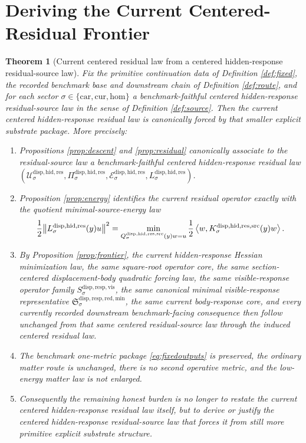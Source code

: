 \documentclass[11pt]{article}
\newcommand{\Car}{\mathrm{car}}
\newcommand{\Cur}{\mathrm{cur}}
\newcommand{\Hom}{\mathrm{hom}}
\newcommand{\VisibleResponseOperator}[1]{S_{#1}^{\mathrm{disp,resp,vis}}}
\newcommand{\MinimalReducedStructure}{\mathfrak S^{\mathrm{disp,resp,red,min}}}
\newcommand{\ResidualState}[1]{\mathcal U_{#1}^{\mathrm{disp,hid,res}}}
\newcommand{\ResidualTarget}[1]{\mathcal E_{#1}^{\mathrm{disp,hid,res}}}
\newcommand{\ResidualReadout}[1]{\Pi_{#1}^{\mathrm{disp,hid,res}}}
\newcommand{\ResidualOperator}[1]{L_{#1}^{\mathrm{disp,hid,res}}}
\newcommand{\ResidualSourceProjection}[1]{Q_{#1}^{\mathrm{disp,hid,res,src}}}
\newcommand{\ResidualSourceOperator}[1]{K_{#1}^{\mathrm{disp,hid,res,src}}}
\newtheorem{theorem}{Theorem}
\begin{document}
\section{Deriving the Current Centered-Residual Frontier}

\begin{theorem}[Current centered residual law from a centered hidden-response residual-source law]
\label{thm:main}
Fix the primitive continuation data of Definition \ref{def:fixed}, the recorded benchmark base and downstream chain of Definition \ref{def:route}, and for each sector \(\sigma\in\{\Car,\Cur,\Hom\}\) a benchmark-faithful centered hidden-response residual-source law in the sense of Definition \ref{def:source}. Then the current centered hidden-response residual law is canonically forced by that smaller explicit substrate package. More precisely:
\begin{enumerate}
    \item Propositions \ref{prop:descent} and \ref{prop:residual} canonically associate to the residual-source law a benchmark-faithful centered hidden-response residual law \((\ResidualState{\sigma},\ResidualReadout{\sigma},\ResidualTarget{\sigma},\ResidualOperator{\sigma})\).
    \item Proposition \ref{prop:energy} identifies the current residual operator exactly with the quotient minimal-source-energy law
    \[
    \frac{1}{2}
    \norm{\ResidualOperator{\sigma}(y)u}^{2}
    =
    \min_{\ResidualSourceProjection{\sigma}(y)w=u}
    \frac{1}{2}
    \ev{
    w,\ResidualSourceOperator{\sigma}(y)w
    }.
    \]
    \item By Proposition \ref{prop:frontier}, the current hidden-response Hessian minimization law, the same square-root operator core, the same section-centered displacement-body quadratic forcing law, the same visible-response operator family \(\VisibleResponseOperator{\sigma}\), the same canonical minimal visible-response representative \(\MinimalReducedStructure_{\sigma}\), the same current body-response core, and every currently recorded downstream benchmark-facing consequence then follow unchanged from that same centered residual-source law through the induced centered residual law.
    \item The benchmark one-metric package \eqref{eq:fixedoutputs} is preserved, the ordinary matter route is unchanged, there is no second operative metric, and the low-energy matter law is not enlarged.
    \item Consequently the remaining honest burden is no longer to restate the current centered hidden-response residual law itself, but to derive or justify the centered hidden-response residual-source law that forces it from still more primitive explicit substrate structure.
\end{enumerate}
\end{theorem}
\end{document}
